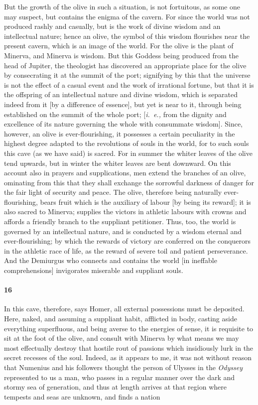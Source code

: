\documentclass[12pt]{article}
\begin{document}
\noindent But the growth of the olive in such a situation, is not fortuitous,
as some one may suspect, but contains the enigma of the cavern. For since the
world was not produced rashly and casually, but is the work of divine wisdom
and an intellectual nature; hence an olive, the symbol of this wisdom
flourishes near the present cavern, which is an image of the world. For the
olive is the plant of Minerva, and Minerva is wisdom. But this Goddess being
produced from the head of Jupiter, the theologist has discovered an appropriate
place for the olive by consecrating it at the summit of the port; signifying by
this that the universe is not the effect of a casual event and the work of
irrational fortune, but that it is the offspring of an intellectual nature and
divine wisdom, which is separated indeed from it [by a difference of essence],
but yet is near to it, through being established on the summit of the whole
port; [\textit{i.~e.,} from the dignity and excellence of its nature governing
the whole with consummate wisdom]. Since, however, an olive is
ever-flourishing, it possesses a certain peculiarity in the highest degree
adapted to the revolutions of souls in the world, for to such souls this cave
(as we have said) is sacred. For in summer the whiter leaves of the olive tend
upwards, but in winter the whiter leaves are bent downward. On this account
also in prayers and supplications, men extend the branches of an olive,
ominating from this that they shall exchange the sorrowful darkness of danger
for the fair light of security and peace. The olive, therefore being naturally
ever-flourishing, bears fruit which is the auxiliary of labour [by being its
reward]; it is also sacred to Minerva; supplies the victors in athletic labours
with crowns and affords a friendly branch to the suppliant petitioner. Thus,
too, the world is governed by an intellectual nature, and is conducted by a
wisdom eternal and ever-flourishing; by which the rewards of victory are
conferred on the conquerors in the athletic race of life, as the reward of
severe toil and patient perseverance. And the Demiurgus who connects and
contains the world [in ineffable comprehensions] invigorates miserable and
suppliant souls.


\paragraph{16} In this cave, therefore, says Homer, all external possessions
must be deposited. Here, naked, and assuming a suppliant habit, afflicted in
body, casting aside everything superfluous, and being averse to the energies of
sense, it is requisite to sit at the foot of the olive, and consult with
Minerva by what means we may most effectually destroy that hostile rout of
passions which insidiously lurk in the secret recesses of the soul. Indeed, as
it appears to me, it was not without reason that Numenius and his followers
thought the person of Ulysses in the \textit{Odyssey} represented to us a man,
who passes in a regular manner over the dark and stormy sea of generation, and
thus at length arrives at that region where tempests and seas are unknown, and
finds a nation
\end{document}
